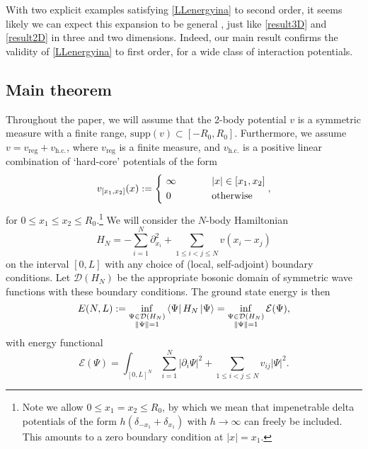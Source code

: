\documentclass[a4paper,11pt]{article}
\newcommand{\supp}{\text{supp}}
\newcommand{\abs}[1]{\left\lvert #1 \right\rvert}
\newcommand{\dom}[1]{\mathcal D\left(#1\right)}
\numberwithin{equation}{section}
\begin{document}
	With two explicit examples satisfying \eqref{LLenergyina} to second order, it seems likely we can expect this expansion to be general \cite{astrakharchik2010low}, just like \eqref{result3D} and \eqref{result2D} in three and two dimensions. Indeed, our main result confirms the validity of \eqref{LLenergyina} to first order, for a wide class of interaction potentials.
	
	\subsection{Main theorem}
	\label{secMain}
	Throughout the paper, we will assume that the 2-body potential $v$ is a symmetric measure with a finite range, $\supp(v)\subset[-R_0,R_0]$. Furthermore, we assume $ v=v_{\text{reg}}+v_{\text{h.c.}}$, where $ v_{\text{reg}}$ is a finite measure, and $ v_{\text{h.c.}} $ is a positive linear combination of `hard-core' potentials of the form 
	\begin{equation}
		v_{[x_1,x_2]}(x):=\begin{cases*}
			\ \infty& \phantom{when} $|x|\in [x_1,x_2]$\\
			\ 0 & \phantom{when} \text{otherwise}
		\end{cases*},
	\end{equation}
	for $0\leq x_1\leq x_2\leq R_0$.\footnote{Note we allow $0\leq x_1=x_2\leq R_0$, by which we mean that impenetrable delta potentials of the form $h(\delta_{-x_1}+\delta_{x_1})$ with $h\to\infty$ can freely be included. This amounts to a zero boundary condition at $|x|=x_1$.}
	We will consider the $N$-body Hamiltonian 
	\begin{equation}
		\label{H_N}
		H_N=-\sum^N_{i=1}\partial^2_{x_i}+\sum_{1\leq i<j\leq N}v(x_i-x_j)
	\end{equation}
	on the interval $[0,L]$ with any choice of (local, self-adjoint) boundary conditions. Let $\dom{H_N}$ be the appropriate bosonic domain of symmetric wave functions with these boundary conditions. The ground state energy is then
	\begin{equation}
		\label{vari}
		E(N,L):=\inf_{\substack{\Psi\in\dom{H_N}\\\|\Psi\|=1}}\bra{\Psi}H_N\ket{\Psi}=\inf_{\substack{\Psi\in\dom{H_N}\\\|\Psi\|=1}}\mathcal{E}(\Psi),
	\end{equation}
	with energy functional
	\begin{equation}
		\label{enfunctional}
		\mathcal{E}(\Psi)=\int_{[0,L]^N}\sum_{i=1}^{N}\abs{\partial_i\Psi}^2+\sum_{1\leq i<j\leq N}v_{ij}\abs{\Psi}^2.
	\end{equation}
	
\end{document}
